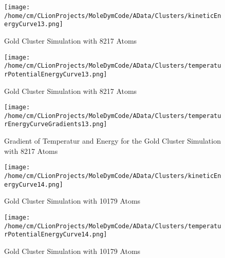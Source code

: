 \begin{figure}[!h] 
    \begin{center} 
        \texttt{[image: /home/cm/CLionProjects/MoleDymCode/AData/Clusters/kineticEnergyCurve13.png]} 
    \end{center} 
    \caption[Gold Cluster Simulation with 8217 Atoms]{Gold Cluster Simulation with 8217 Atoms} 
    \label{GoldClusterSimulationKineticTime8217} 
\end{figure} 
 
\begin{figure}[!h] 
    \begin{center} 
        \texttt{[image: /home/cm/CLionProjects/MoleDymCode/AData/Clusters/temperaturPotentialEnergyCurve13.png]} 
    \end{center} 
    \caption[Gold Cluster Simulation with 8217 Atoms]{Gold Cluster Simulation with 8217 Atoms} 
    \label{GoldClusterSimulationTemperaturEnergy8217} 
\end{figure} 
 
\begin{figure}[!h] 
    \begin{center} 
        \texttt{[image: /home/cm/CLionProjects/MoleDymCode/AData/Clusters/temperaturEnergyCurveGradients13.png]} 
    \end{center} 
    \caption[Gradient of Temperatur and Energy for the Gold Cluster Simulation with 8217 Atoms]{Gradient of Temperatur and Energy for the Gold Cluster Simulation with 8217 Atoms} 
    \label{GoldClusterSimulationGradient8217} 
\end{figure} 
 
\begin{figure}[!h] 
    \begin{center} 
        \texttt{[image: /home/cm/CLionProjects/MoleDymCode/AData/Clusters/kineticEnergyCurve14.png]} 
    \end{center} 
    \caption[Gold Cluster Simulation with 10179 Atoms]{Gold Cluster Simulation with 10179 Atoms} 
    \label{GoldClusterSimulationKineticTime10179} 
\end{figure} 
 
\begin{figure}[!h] 
    \begin{center} 
        \texttt{[image: /home/cm/CLionProjects/MoleDymCode/AData/Clusters/temperaturPotentialEnergyCurve14.png]} 
    \end{center} 
    \caption[Gold Cluster Simulation with 10179 Atoms]{Gold Cluster Simulation with 10179 Atoms} 
    \label{GoldClusterSimulationTemperaturEnergy10179} 
\end{figure} 
 
